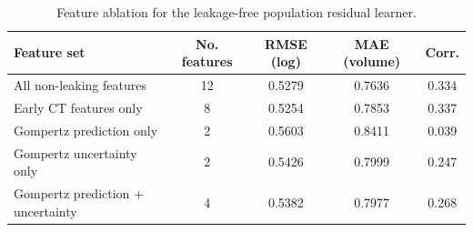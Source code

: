 \begin{table}[t]
\centering
\caption{Feature ablation for the leakage-free population residual learner.}
\label{tab:nlstt_population_residual_ablation}
\begin{tabular}{lcccc}
\toprule
Feature set & No. features & RMSE (log) & MAE (volume) & Corr. \\
\midrule
All non-leaking features & 12 & 0.5279 & 0.7636 & 0.334 \\
Early CT features only & 8 & 0.5254 & 0.7853 & 0.337 \\
Gompertz prediction only & 2 & 0.5603 & 0.8411 & 0.039 \\
Gompertz uncertainty only & 2 & 0.5426 & 0.7999 & 0.247 \\
Gompertz prediction + uncertainty & 4 & 0.5382 & 0.7977 & 0.268 \\
\bottomrule
\end{tabular}
\end{table}
